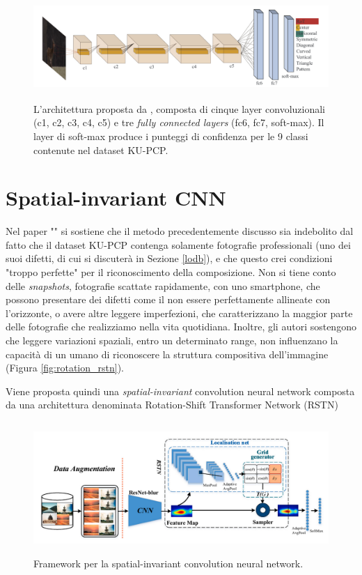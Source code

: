 \vspace{7mm}
\begin{figure}[hb]
    \centering
    \includegraphics[height=40mm]{Immagini/sota/dominant_geometric_arch.png}
    \caption{L'architettura proposta da \cite{composition_dominant_geometric}, composta di cinque layer convoluzionali (c1, c2, c3, c4, c5) e tre \textit{fully connected layers} (fc6, fc7, soft-max). Il layer di soft-max produce i punteggi di confidenza per le 9 classi contenute nel dataset KU-PCP.}
    \label{fig:arch_dominant_geometric}
\end{figure}

\section{Spatial-invariant CNN}
\label{spatial-invariant-cnn}
Nel paper "\textit{}" \cite{spatial_invariant_cnn} si sostiene che il metodo precedentemente discusso sia indebolito dal fatto che il dataset KU-PCP contenga solamente fotografie professionali (uno dei suoi difetti, di cui si discuterà in Sezione \ref{lodb}), e che questo crei condizioni "troppo perfette" per il riconoscimento della composizione. Non si tiene conto delle \textit{snapshots}, fotografie scattate rapidamente, con uno smartphone, che possono presentare dei difetti come il non essere perfettamente allineate con l'orizzonte, o avere altre leggere imperfezioni, che caratterizzano la maggior parte delle fotografie che realizziamo nella vita quotidiana. Inoltre, gli autori sostengono che leggere variazioni spaziali, entro un determinato range, non influenzano la capacità di un umano di riconoscere la struttura compositiva dell'immagine (Figura \ref{fig:rotation_rstn}).

Viene proposta quindi una \textit{spatial-invariant} convolution neural network composta da una architettura denominata Rotation-Shift Transformer Network (RSTN) 

\begin{figure}[b]
    \centering
    \includegraphics[height=50mm]{Immagini/sota/spatial_invariant_cnn.png}
    \captionsetup{justification=centering}
    \caption{Framework per la spatial-invariant convolution neural network.}
    \label{fig:rstn}
\end{figure}

